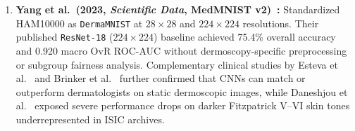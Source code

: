 \begin{enumerate}
  \item \textbf{Yang et al.\ (2023, \emph{Scientific Data}, MedMNIST v2)~\cite{Yang2023medmnist}:} Standardized HAM10000 as \texttt{DermaMNIST} at $28\times 28$ and $224\times 224$ resolutions. Their published \texttt{ResNet-18} ($224\times 224$) baseline achieved 75.4\% overall accuracy and 0.920 macro OvR ROC-AUC without dermoscopy-specific preprocessing or subgroup fairness analysis. Complementary clinical studies by Esteva et al.~\cite{Esteva2017dermatologist} and Brinker et al.~\cite{Brinker2019deep} further confirmed that CNNs can match or outperform dermatologists on static dermoscopic images, while Daneshjou et al.~\cite{Daneshjou2022disparities} exposed severe performance drops on darker Fitzpatrick V--VI skin tones underrepresented in ISIC archives.
\end{enumerate}
